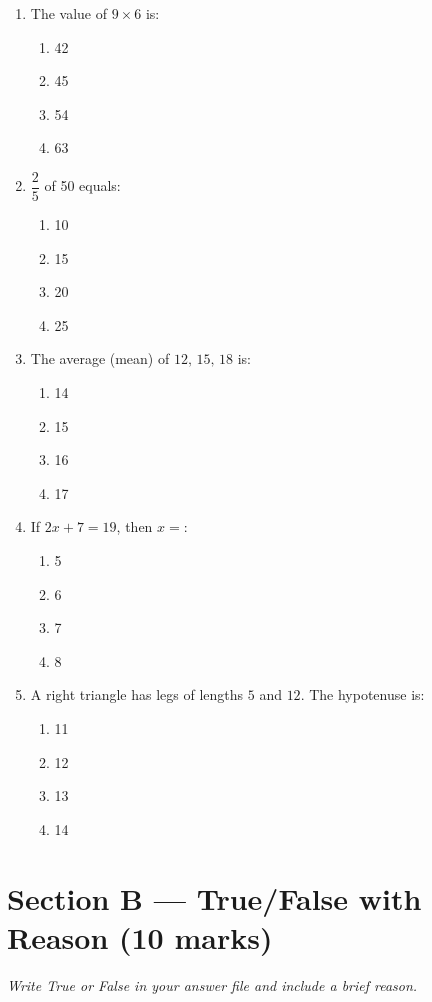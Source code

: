 \documentclass[12pt]{article}
\begin{document}
\begin{enumerate}[label=\arabic*.]

\item The value of $9 \times 6$ is:
\begin{enumerate}[label=(\alph*)]
    \item 42 \qquad \item 45 \qquad \item 54 \qquad \item 63
\end{enumerate}

\item $\dfrac{2}{5}$ of 50 equals:
\begin{enumerate}[label=(\alph*)]
    \item 10 \qquad \item 15 \qquad \item 20 \qquad \item 25
\end{enumerate}

\item The average (mean) of $12,\,15,\,18$ is:
\begin{enumerate}[label=(\alph*)]
    \item 14 \qquad \item 15 \qquad \item 16 \qquad \item 17
\end{enumerate}

\item If $2x + 7 = 19$, then $x =$:
\begin{enumerate}[label=(\alph*)]
    \item 5 \qquad \item 6 \qquad \item 7 \qquad \item 8
\end{enumerate}

\item A right triangle has legs of lengths $5$ and $12$. The hypotenuse is:
\begin{enumerate}[label=(\alph*)]
    \item 11 \qquad \item 12 \qquad \item 13 \qquad \item 14
\end{enumerate}

\end{enumerate}

\section*{Section B — True/False with Reason (10 marks)}
\textit{Write True or False in your answer file and include a brief reason.}
\end{document}
